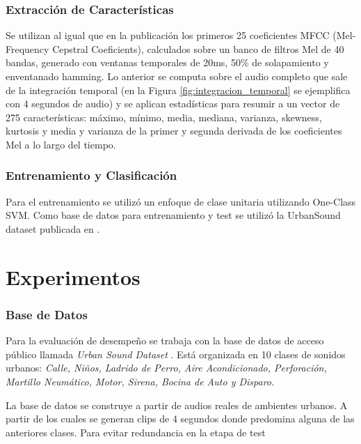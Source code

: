 \documentclass{article}
\begin{document}
\subsubsection*{Extracción de Características}
Se utilizan al igual que en la publicación \cite{Salamon:UrbanSound:ACMMM:14} los primeros 25 coeficientes MFCC (Mel-Frequency Cepstral Coeficients), calculados sobre un banco de filtros Mel de 40 bandas, generado con ventanas temporales de 20ms, 50\% de solapamiento y enventanado hamming. Lo anterior se computa sobre el audio completo que sale de la integración temporal (en la Figura \ref{fig:integracion_temporal} se ejemplifica con 4 segundos de audio) y se aplican estadísticas para resumir a un vector de 275 características: máximo, mínimo, media, mediana, varianza, skewness, kurtosis y media y varianza de la primer y segunda derivada de los coeficientes Mel a lo largo del tiempo.

\subsubsection*{Entrenamiento y Clasificación}
Para el entrenamiento se utilizó un enfoque de clase unitaria utilizando One-Class SVM. Como base de datos para entrenamiento y test se utilizó la UrbanSound dataset publicada en \cite{Salamon:UrbanSound:ACMMM:14}. 


\section{Experimentos}
\label{experimentos}

\subsubsection*{Base de Datos}
Para la evaluación de desempeño se trabaja con la base de datos de acceso público llamada \textit{Urban Sound Dataset} \citep{Salamon:UrbanSound:ACMMM:14}. Está organizada en 10 clases de sonidos urbanos: \textit{Calle, Niños, Ladrido de Perro, Aire Acondicionado, Perforación, Martillo Neumático, Motor, Sirena, Bocina de Auto y Disparo.}

La base de datos se construye a partir de audios reales de ambientes urbanos. A partir de los cuales se generan clips de 4 segundos donde predomina alguna de las anteriores clases. Para evitar redundancia en la etapa de test 
\end{document}
